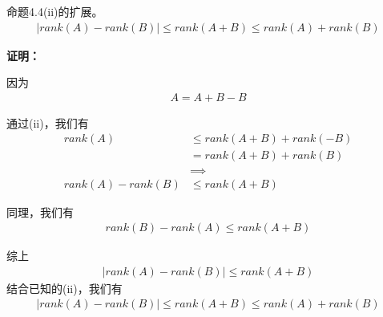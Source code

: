 \documentclass{article}
\begin{document}
\begin{zremark}
  命题4.4(ii)的扩展。
  \begin{align*}
    |rank(A) - rank(B)| \leq rank(A + B) \leq rank(A) + rank(B)
  \end{align*}
\end{zremark}

\textbf{证明：}

因为
\begin{align*}
  A = A + B - B
\end{align*}

通过(ii)，我们有
\begin{align*}
  rank(A)           & \leq rank(A + B) + rank(-B) \\
                    & = rank(A + B) + rank(B)     \\
                    & \implies                    \\
  rank(A) - rank(B) & \leq rank(A + B)
\end{align*}

同理，我们有
\begin{align*}
  rank(B) - rank(A) \leq rank(A + B)
\end{align*}

综上
\begin{align*}
  |rank(A) - rank(B)| \leq rank(A + B)
\end{align*}
结合已知的(ii)，我们有
\begin{align*}
  |rank(A) - rank(B)| \leq rank(A + B) \leq rank(A) + rank(B)
\end{align*}
\end{document}
